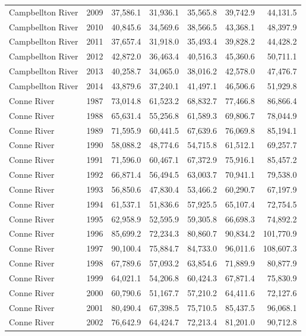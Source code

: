 \begin{longtable}{llrrrrr}
  Campbellton River & 2009 & 37,586.1 & 31,936.1 & 35,565.8 & 39,742.9 & 44,131.5 \\ 
  Campbellton River & 2010 & 40,845.6 & 34,569.6 & 38,566.5 & 43,368.1 & 48,397.9 \\ 
  Campbellton River & 2011 & 37,657.4 & 31,918.0 & 35,493.4 & 39,828.2 & 44,428.2 \\ 
  Campbellton River & 2012 & 42,872.0 & 36,463.4 & 40,516.3 & 45,360.6 & 50,711.1 \\ 
  Campbellton River & 2013 & 40,258.7 & 34,065.0 & 38,016.2 & 42,578.0 & 47,476.7 \\ 
  Campbellton River & 2014 & 43,879.6 & 37,240.1 & 41,497.1 & 46,506.6 & 51,929.8 \\ 
  Conne River & 1987 & 73,014.8 & 61,523.2 & 68,832.7 & 77,466.8 & 86,866.4 \\ 
  Conne River & 1988 & 65,631.4 & 55,256.8 & 61,589.3 & 69,806.7 & 78,044.9 \\ 
  Conne River & 1989 & 71,595.9 & 60,441.5 & 67,639.6 & 76,069.8 & 85,194.1 \\ 
  Conne River & 1990 & 58,088.2 & 48,774.6 & 54,715.8 & 61,512.1 & 69,257.7 \\ 
  Conne River & 1991 & 71,596.0 & 60,467.1 & 67,372.9 & 75,916.1 & 85,457.2 \\ 
  Conne River & 1992 & 66,871.4 & 56,494.5 & 63,003.7 & 70,941.1 & 79,538.0 \\ 
  Conne River & 1993 & 56,850.6 & 47,830.4 & 53,466.2 & 60,290.7 & 67,197.9 \\ 
  Conne River & 1994 & 61,537.1 & 51,836.6 & 57,925.5 & 65,107.4 & 72,754.5 \\ 
  Conne River & 1995 & 62,958.9 & 52,595.9 & 59,305.8 & 66,698.3 & 74,892.2 \\ 
  Conne River & 1996 & 85,699.2 & 72,234.3 & 80,860.7 & 90,834.2 & 101,770.9 \\ 
  Conne River & 1997 & 90,100.4 & 75,884.7 & 84,733.0 & 96,011.6 & 108,607.3 \\ 
  Conne River & 1998 & 67,789.6 & 57,093.2 & 63,854.6 & 71,889.9 & 80,877.9 \\ 
  Conne River & 1999 & 64,021.1 & 54,206.8 & 60,424.3 & 67,871.4 & 75,830.9 \\ 
  Conne River & 2000 & 60,790.6 & 51,167.7 & 57,210.2 & 64,411.6 & 72,127.6 \\ 
  Conne River & 2001 & 80,490.4 & 67,398.5 & 75,710.5 & 85,437.5 & 96,068.1 \\ 
  Conne River & 2002 & 76,642.9 & 64,424.7 & 72,213.4 & 81,201.0 & 90,712.8 \\ 

\end{longtable}
